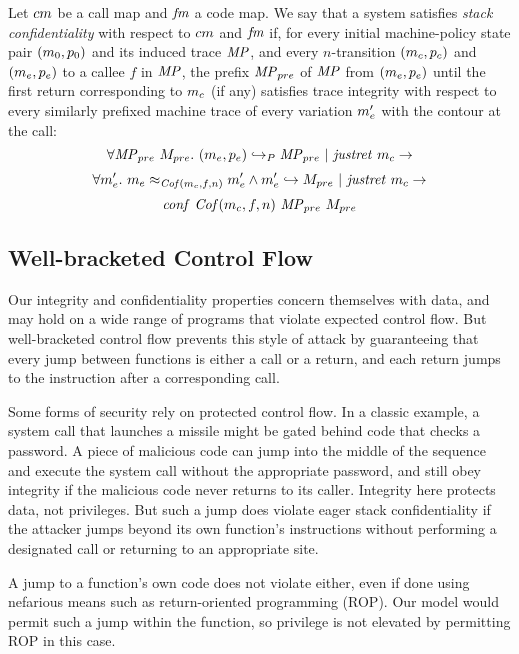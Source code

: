 \documentclass[acmsmall,review,anonymous]{acmart}\settopmatter{printfolios=true,printccs=false,printacmref=false}
\begin{document}
Let $cm$ be a call map and $\mathit{fm}$ a code map. We say that a
system satisfies {\em stack confidentiality} with respect to
$cm$ and $\mathit{fm}$ if, for every initial machine-policy state
pair $(m_0, p_0)$ and its induced trace $\mathit{MP}$, and every
$n$-transition $(m_c, p_c)$ and $(m_e, p_e)$ to a callee
$f$ in $\mathit{MP}$, the prefix $\mathit{MP}_{pre}$ of $\mathit{MP}$ from $(m_e, p_e)$
until the first return corresponding to $m_c$ (if any) satisfies
trace integrity with respect to every similarly prefixed machine trace
of every variation $m_e'$ with the contour at the call:
$$\forall \mathit{MP}_{pre} ~ M_{pre}. ~
(m_e,p_e) \hookrightarrow_P \mathit{MP}_{pre} ~ | ~ \mathit{justret}\ m_c \rightarrow$$
$$\forall m_e'. ~ m_e \approx_{\mathit{Cof}(m_c, f, n)} m_e' \wedge
m_e' \hookrightarrow M_{pre} ~ | ~ \mathit{justret}\ m_c \rightarrow$$
$$\mathit{conf}~\mathit{Cof}(m_c, f, n) ~ \mathit{MP}_{pre} ~ M_{pre}$$

\subsection{Well-bracketed Control Flow}
\label{sec:wbcf}

Our integrity and confidentiality properties concern themselves with
data, and may hold on a wide range of programs that violate expected
control flow.  But well-bracketed control flow prevents this style of
attack by guaranteeing that every jump between functions is either a
call or a return, and each return jumps to the instruction after a
corresponding call.

    Some forms of security rely on protected control flow. In a classic
    example, a system call that launches a missile might be gated behind code
    that checks a password. A piece of malicious code can jump into the middle
    of the sequence and execute the system call without the appropriate password,
    and still obey integrity if the malicious code never returns to its caller.
    Integrity here protects data, not privileges. But such a jump does violate
    eager stack confidentiality if the attacker jumps beyond its own function's
    instructions without performing a designated call or returning to an
    appropriate site.

    A jump to a function's own code does not violate either, even if done using
    nefarious means such as return-oriented programming (ROP). Our model would
    permit such a jump within the function, so privilege is not elevated by
    permitting ROP in this case.
\end{document}
